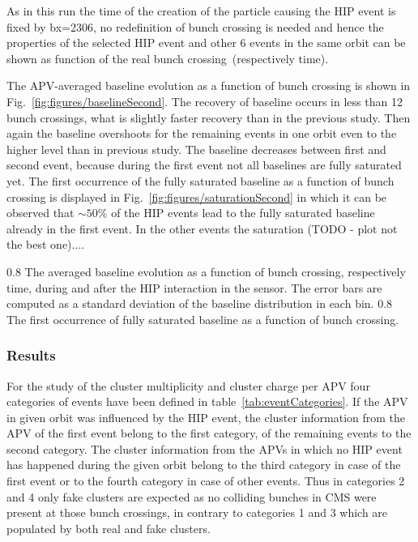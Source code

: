 As in this run the time of the creation of the particle causing the HIP event is fixed by bx=2306, no redefinition of bunch crossing is needed and hence the properties of the selected HIP event and other 6 events in the same orbit can be shown as function of the real bunch crossing~(respectively time).

The APV-averaged baseline evolution as a function of bunch crossing is shown in Fig.~\ref{fig:figures/baselineSecond}. The recovery of baseline occurs in less than 12 bunch crossings, what is slightly faster recovery than in the previous study. Then again the baseline overshoots for the remaining events in one orbit even to the higher level than in previous study. The baseline decreases between first and second event, because during the first event not all baselines are fully saturated yet. The first occurrence of the fully saturated baseline as a function of bunch crossing is displayed in Fig.~\ref{fig:figures/saturationSecond} in which it can be observed that $\sim 50\%$ of the HIP events lead to the fully saturated baseline already in the first event. In the other events the saturation (TODO - plot not the best one)....

                 {0.8}       %
                 {The averaged baseline evolution as a function of bunch crossing, respectively time, during and after the HIP interaction in the sensor. The error bars are computed as a standard deviation of the baseline distribution in each bin.  } %
                 {0.8}       %
                 { The first occurrence of fully saturated baseline as a function of bunch crossing. } %
 
\subsubsection{Results}

For the study of the cluster multiplicity and cluster charge per APV four categories of events have been defined in table~\ref{tab:eventCategories}. If the APV in given orbit was influenced by the HIP event, the cluster information from the APV of the first event belong to the first category, of the remaining events to the second category. The cluster information from the APVs in which no HIP event has happened during the given orbit belong to the third category in case of the first event or to the fourth category in case of other events. Thus in categories 2 and 4 only fake clusters are expected as no colliding bunches in CMS were present at those bunch crossings, in contrary to categories 1 and 3 which are populated by both real and fake clusters.

